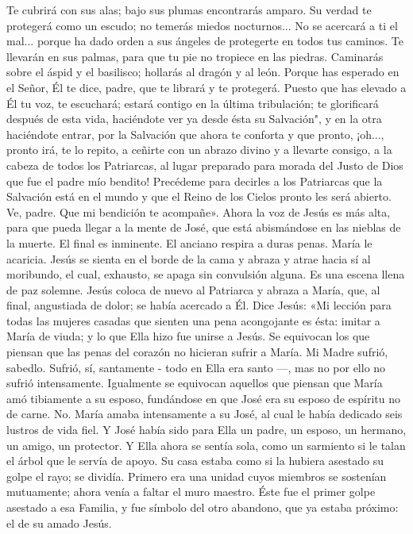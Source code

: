 \documentclass[12pt]{book} %
\begin{document}
Te cubrirá con sus alas; bajo sus plumas encontrarás amparo. 
Su verdad te protegerá como un escudo; no temerás miedos nocturnos... 
No se acercará a ti el mal... porque ha dado orden a sus ángeles de protegerte en todos tus caminos. 
Te llevarán en sus palmas, para que tu pie no tropiece en las piedras. 
Caminarás sobre el áspid y el basilisco; hollarás al dragón y al león. 
Porque has esperado en el Señor, Él te dice, padre, que te librará y te protegerá. 
Puesto que has elevado a Él tu voz, te escuchará; estará contigo en la última tribulación; te glorificará después de esta 
vida, haciéndote ver ya desde ésta su Salvación", y en la otra haciéndote entrar, por la Salvación que ahora te conforta y que pronto, ¡oh..., pronto irá, te lo repito, a ceñirte con un abrazo divino y a llevarte consigo, a la cabeza de todos los Patriarcas, al lugar preparado para morada del Justo de Dios que fue el padre mío bendito! 
Precédeme para decirles a los Patriarcas que la Salvación está en el mundo y que el Reino de los Cielos pronto les será 
abierto. Ve, padre. Que mi bendición te acompañe».              
Ahora la voz de Jesús es más alta, para que pueda llegar a la mente de José, que está abismándose en las nieblas de la 
muerte. El final es inminente. El anciano respira a duras penas. María le acaricia. Jesús se sienta en el borde de la cama y abraza y atrae hacia sí al moribundo, el cual, exhausto, se apaga sin convulsión alguna. 
Es una escena llena de paz solemne. Jesús coloca de nuevo al Patriarca y abraza a María, que, al final, angustiada de 
dolor; se había acercado a Él. 
Dice Jesús: 
«Mi lección para todas las mujeres casadas que sienten una pena acongojante es ésta: imitar a María de viuda; y lo que Ella hizo fue unirse a Jesús. 
Se equivocan los que piensan que las penas del corazón no hicieran sufrir a María. Mi Madre sufrió, sabedlo. Sufrió, sí, 
santamente - todo en Ella era santo —, mas no por ello no sufrió intensamente. 
Igualmente se equivocan aquellos que piensan que María amó tibiamente a su esposo, fundándose en que José era su 
esposo de espíritu no de carne. No. María amaba intensamente a su José, al cual le había dedicado seis lustros de vida fiel. Y José había sido para Ella un padre, un esposo, un hermano, un amigo, un protector. 
Y Ella ahora se sentía sola, como un sarmiento si le talan el árbol que le servía de apoyo. Su casa estaba como si la hubiera asestado su golpe el rayo; se dividía. Primero era una unidad cuyos miembros se sostenían mutuamente; ahora venía a faltar el muro maestro. Éste fue el primer golpe asestado a esa Familia, y fue símbolo del otro abandono, que ya estaba próximo: el de su amado Jesús. 
\end{document}
